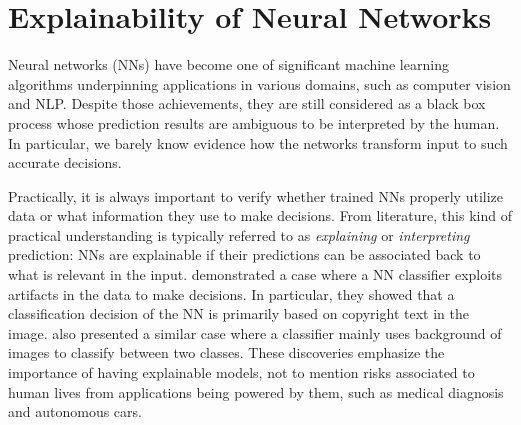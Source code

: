 \section{Explainability of Neural Networks}
Neural networks (NNs) have become one of significant machine learning algorithms underpinning applications in various domains, such as  computer vision and NLP. Despite those achievements, they are still considered as a black box process whose prediction results are ambiguous to be interpreted by the human. In particular, we barely know evidence how the networks transform input to such accurate decisions.

%  
%
%

%


Practically, it is always important to verify whether trained NNs properly utilize data or what information they use to make decisions. From literature, this kind of practical understanding is typically referred to as \textit{explaining} or \textit{interpreting} prediction: NNs are explainable if their predictions can be associated back to what is relevant in the input. \citet{BachAnalyzingclassifiersFisher2016} demonstrated a case where a NN classifier exploits artifacts in the data to make decisions. In particular, they showed that  a classification decision of the NN is primarily based on copyright text in the image. \citet{RibeiroWhyShouldTrust2016} also presented a similar case where a classifier mainly uses background of images to classify between two classes. These discoveries emphasize the importance of having explainable models, not to mention risks associated to human lives from applications being powered by them, such as medical diagnosis and autonomous cars.
%


